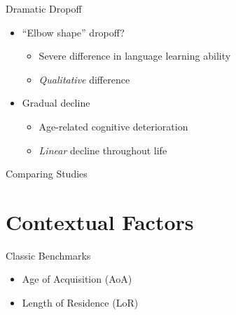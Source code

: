 \documentclass{beamer}
\begin{document}
\begin{frame}{Dramatic Dropoff}
  \begin{itemize}
    \item ``Elbow shape'' dropoff?
    \begin{itemize}
      \item Severe difference in language learning ability
      \item \emph{Qualitative} difference
    \end{itemize}
    \item Gradual decline
    \begin{itemize}
      \item Age-related cognitive deterioration
      \item \emph{Linear} decline throughout life
    \end{itemize}
  \end{itemize}
\end{frame}

\begin{frame}{Comparing Studies} %
\end{frame}

\section{Contextual Factors}

\begin{frame}{Classic Benchmarks} %
    \begin{itemize}
        \item Age of Acquisition (AoA)
        \item Length of Residence (LoR)

    \end{itemize}
\end{frame}
\end{document}
